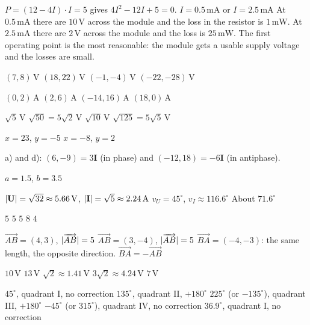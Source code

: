 
\begin{facit}

  $P = (12 - 4I) \cdot I = 5$ gives $4I^2 - 12I + 5 = 0$.
 $I = 0.5\,\text{mA}$ or $I = 2.5\,\text{mA}$
 At $0.5\,\text{mA}$ there are $10\,\text{V}$ across the module and the loss in the resistor
is $1\,\text{mW}$. At $2.5\,\text{mA}$ there are $2\,\text{V}$ across the module and the loss is
$25\,\text{mW}$. The first operating point is the most reasonable: the module gets a usable supply
voltage and the losses are small.

  $(7, 8)\,\text{V}$  $(18, 22)\,\text{V}$  $(-1, -4)\,\text{V}$
 $(-22, -28)\,\text{V}$

  $(0, 2)\,\text{A}$  $(2, 6)\,\text{A}$  $(-14, 16)\,\text{A}$  $(18, 0)\,\text{A}$

  $\sqrt{5}\,\text{V}$  $\sqrt{50} = 5\sqrt{2}\,\text{V}$  $\sqrt{10}\,\text{V}$
 $\sqrt{125} = 5\sqrt{5}\,\text{V}$

  $x = 23$, $y = -5$  $x = -8$, $y = 2$

 a) and d): $(6, -9) = 3\mathbf{I}$ (in phase) and $(-12, 18) = -6\mathbf{I}$ (in antiphase).

 $a = 1.5$, $b = 3.5$

  $\lvert\mathbf{U}\rvert = \sqrt{32} \approx 5.66\,\text{V}$, $\lvert\mathbf{I}\rvert = \sqrt{5} \approx 2.24\,\text{A}$
 $v_U = 45^{\circ}$, $v_I \approx 116.6^{\circ}$  About $71.6^{\circ}$

  $5$  $5$  $5$  $8$  $4$

  $\overrightarrow{AB} = (4, 3)$, $\lvert\overrightarrow{AB}\rvert = 5$
 $\overrightarrow{AB} = (3, -4)$, $\lvert\overrightarrow{AB}\rvert = 5$
 $\overrightarrow{BA} = (-4, -3)$: the same length, the opposite direction.
 $\overrightarrow{BA} = -\overrightarrow{AB}$

  $10\,\text{V}$  $13\,\text{V}$  $\sqrt{2} \approx 1.41\,\text{V}$
 $3\sqrt{2} \approx 4.24\,\text{V}$  $7\,\text{V}$

  $45^{\circ}$, quadrant I, no correction
 $135^{\circ}$, quadrant II, $+180^{\circ}$
 $225^{\circ}$ (or $-135^{\circ}$), quadrant III, $+180^{\circ}$
 $-45^{\circ}$ (or $315^{\circ}$), quadrant IV, no correction
 $36.9^{\circ}$, quadrant I, no correction


\end{facit}
